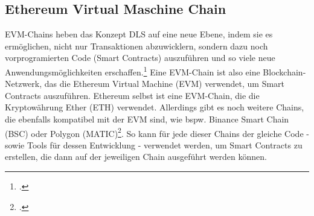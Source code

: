 \subsection{Ethereum Virtual Maschine Chain}
\label{sec:definition-evm-chain}
EVM-Chains heben das Konzept DLS auf eine neue Ebene, indem sie es ermöglichen, nicht nur Transaktionen abzuwicklern, sondern dazu noch vorprogramierten Code (Smart Contracts) auszuführen und so viele neue Anwendungsmöglichkeiten erschaffen.\footcite[Vgl. hierzu und zum Folgenden][]{w5}
Eine EVM-Chain ist also eine Blockchain-Netzwerk, das die Ethereum Virtual Machine (EVM) verwendet, um Smart Contracts auszuführen.
Ethereum selbst ist eine EVM-Chain, die die Kryptowährung Ether (ETH) verwendet. Allerdings gibt es noch weitere Chains, die ebenfalls kompatibel mit der EVM sind, wie bspw. Binance Smart Chain (BSC) oder Polygon (MATIC)\footcite[Vgl.][]{w6}.
So kann für jede dieser Chains der gleiche Code - sowie Tools für dessen Entwicklung - verwendet werden, um Smart Contracts zu erstellen, die dann auf der jeweiligen Chain ausgeführt werden können.